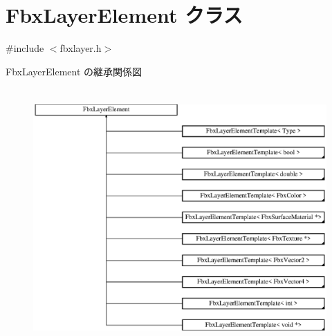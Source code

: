 \hypertarget{class_fbx_layer_element}{}\section{Fbx\+Layer\+Element クラス}
\label{class_fbx_layer_element}


{\ttfamily \#include $<$fbxlayer.\+h$>$}

Fbx\+Layer\+Element の継承関係図\begin{figure}[H]
\begin{center}
\leavevmode
\includegraphics[height=9.903537cm]{class_fbx_layer_element}
\end{center}
\end{figure}
